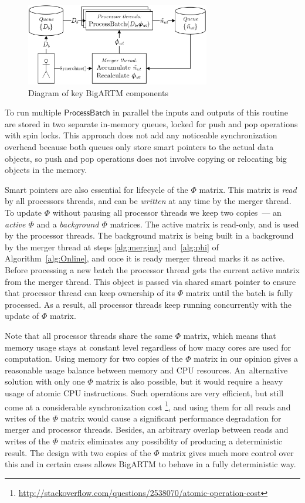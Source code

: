 \documentclass{sig-alternate}
\newcommand{\kw}[1]{\textsf{#1}}
\begin{document}
\begin{figure}[t]
\begin{centering}
\includegraphics[height=36mm]{diagramm_artm_core.eps}
\caption{Diagram of key BigARTM components}
\label{fig:diagramm_artm_core}
\end{centering}
\end{figure}

To run multiple $\kw{ProcessBatch}$ in parallel the inputs and outputs of this routine are stored in two separate in-memory queues,
locked for push and pop operations with spin locks.
This approach does not add any noticeable synchronization overhead because
both queues only store smart pointers to the actual data objects,
so push and pop operations does not involve copying or relocating big objects in the memory.

Smart pointers are also essential for lifecycle of the $\Phi$ matrix.
This matrix is \emph{read} by all processors threads, and can be \emph{written} at any time by the merger thread.
To update $\Phi$ without pausing all processor threads we keep two copies~--- an \emph{active $\Phi$} and a \emph{background $\Phi$} matrices.
The active matrix is read-only, and is used by the processor threads.
The background matrix is being built in a background by the merger thread
at steps \ref{alg:merging} and~\ref{alg:phi} of Algorithm~\ref{alg:Online},
and once it is ready merger thread marks it as active.
Before processing a new batch the processor thread gets the current active matrix from the merger thread.
This object is passed via shared smart pointer to ensure that processor thread can keep ownership of its $\Phi$ matrix
until the batch is fully processed.
As a result, all processor threads keep running concurrently with the update of $\Phi$ matrix.

Note that all processor threads share the same $\Phi$ matrix,
which means that memory usage stays at constant level regardless of how many cores are used for computation.
Using memory for two copies of the $\Phi$ matrix in our opinion gives a reasonable usage balance between memory and CPU resources.
An~alternative solution with only one $\Phi$ matrix is also possible, but it would require a heavy usage of atomic CPU instructions.
Such operations are very efficient, but still come at a considerable synchronization cost%
\footnote{\url{http://stackoverflow.com/questions/2538070/atomic-operation-cost}},
and using them for all reads and writes of the $\Phi$ matrix would cause a significant performance degradation for merger and processor threads.
Besides, an arbitrary overlap between reads and writes of the $\Phi$ matrix eliminates any possibility of producing a deterministic result.
The design with two copies of the $\Phi$ matrix gives much more control over this
and in certain cases allows BigARTM to behave in a fully deterministic way.
\end{document}
